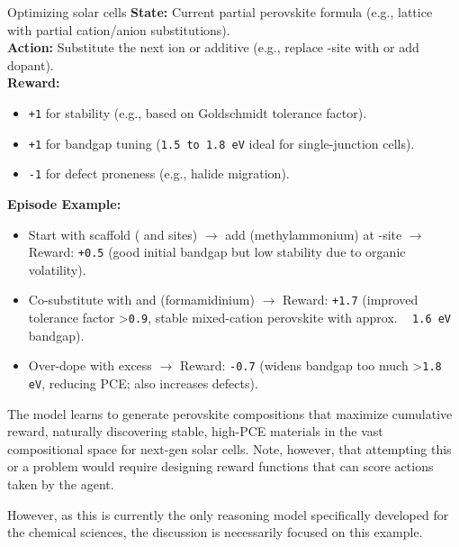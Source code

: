 \begin{reply}
\begin{examplebox}[label={example:rl}]{Optimizing solar cells}
\textbf{State:} Current partial perovskite formula (e.g.,  lattice with partial cation/anion substitutions). \\

\textbf{Action:} Substitute the next ion or additive (e.g., replace -site with  or add  dopant). \\

\textbf{Reward:}
\begin{itemize}
    \item \texttt{+1} for stability (e.g., based on Goldschmidt tolerance factor).
    \item \texttt{+1} for bandgap tuning (\texttt{1.5 to 1.8 eV} ideal for single-junction cells).
    \item \texttt{-1} for defect proneness (e.g., halide migration).
\end{itemize}

\textbf{Episode Example:}

\begin{itemize}
    \item Start with  scaffold ( and  sites) $\rightarrow$ add  (methylammonium) at -site $\rightarrow$ Reward: \texttt{+0.5} (good initial bandgap but low stability due to organic volatility).
    \item Co-substitute with  and  (formamidinium) $\rightarrow$ Reward: \texttt{+1.7} (improved tolerance factor \textgreater{}\texttt{0.9}, stable mixed-cation perovskite with approx. ~ \texttt{1.6 eV} bandgap).
    \item Over-dope with excess  $\rightarrow$ Reward: \texttt{-0.7} (widens bandgap too much \textgreater{}\texttt{1.8 eV}, reducing PCE; also increases defects).
\end{itemize}


The model learns to generate perovskite compositions that maximize cumulative reward, naturally discovering stable, high-PCE materials in the vast compositional space for next-gen solar cells. Note, however, that attempting this or a problem would require designing reward functions that can score actions taken by the agent.

\end{examplebox}

However, as this is currently the only reasoning model specifically developed for the chemical sciences, the discussion is necessarily focused on this example.
\end{reply}


